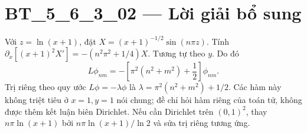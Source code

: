 \documentclass[10pt,a4paper]{article}
\begin{document}
\section*{BT\_5\_6\_3\_02 — Lời giải bổ sung}
Với $z=\ln(x+1)$, đặt $X=(x+1)^{-1/2}\sin(n\pi z)$. Tính $\partial_x[(x+1)^2X']=-(n^2\pi^2+1/4)X$. Tương tự theo $y$. Do đó
\[L\phi_{nm}=-\left[\pi^2(n^2+m^2)+\frac12\right]\phi_{nm}.\]
Trị riêng theo quy ước $L\phi=-\lambda\phi$ là $\lambda=\pi^2(n^2+m^2)+1/2$. Các hàm này không triệt tiêu ở $x=1,y=1$ nói chung; đề chỉ hỏi hàm riêng của toán tử, không được thêm kết luận biên Dirichlet. Nếu cần Dirichlet trên $(0,1)^2$, thay $n\pi\ln(x+1)$ bởi $n\pi\ln(x+1)/\ln2$ và sửa trị riêng tương ứng.
\end{document}
